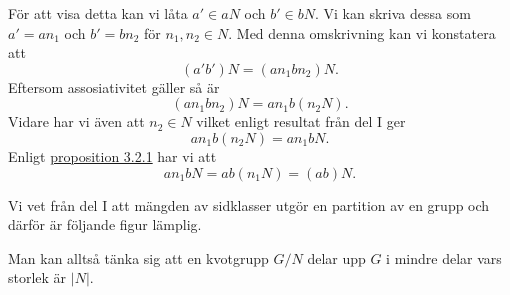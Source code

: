 \documentclass{article}
\theoremstyle{definition}
\begin{document}
För att visa detta kan vi låta $a' \in aN$ och $b' \in bN$. Vi kan skriva dessa som $a' = an_1$ och $b' = bn_2$ för $n_1, n_2 \in N$. Med denna 
omskrivning kan vi konstatera att
\[(a'b')N = (an_1bn_2)N.\]
Eftersom assosiativitet gäller så är 
\[(an_1bn_2)N = an_1b(n_2N).\]
Vidare har vi även att $n_2 \in N$ vilket enligt resultat från del I ger 
\[an_1b(n_2N) = an_1bN.\]
Enligt \hyperlink{prop1}{proposition 3.2.1} har vi att 
\[an_1bN = ab(n_1N) = (ab)N.\]

Vi vet från del I att mängden av sidklasser utgör en partition av en grupp och därför är följande figur lämplig.

\begin{center}
\end{center}
Man kan alltså tänka sig att en kvotgrupp $G/N$ delar upp $G$ i mindre delar vars storlek är $|N|$. 
\end{document}
